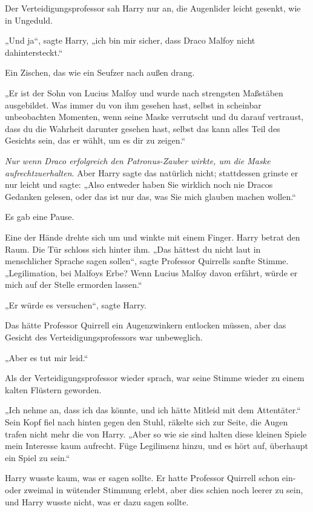 {Der Verteidigungsprofessor sah Harry nur an, die Augenlider leicht gesenkt, wie in Ungeduld.

„Und ja“, sagte Harry, „ich bin mir sicher, dass Draco Malfoy nicht dahintersteckt.“

Ein Zischen, das wie ein Seufzer nach außen drang.

„Er ist der Sohn von Lucius Malfoy und wurde nach strengsten Maßstäben ausgebildet. Was immer du von ihm gesehen hast, selbst in scheinbar unbeobachten Momenten, wenn seine Maske verrutscht und du darauf vertraust, dass du die Wahrheit darunter gesehen hast, selbst das kann alles Teil des Gesichts sein, das er wählt, um es dir zu zeigen.“

\emph{Nur wenn Draco erfolgreich den Patronus-Zauber wirkte, um die Maske aufrechtzuerhalten}. Aber Harry sagte das natürlich nicht; stattdessen grinste er nur leicht und sagte: „Also entweder haben Sie wirklich noch nie Dracos Gedanken gelesen, oder das ist nur das, was Sie mich glauben machen wollen.“

Es gab eine Pause.

Eine der Hände drehte sich um und winkte mit einem Finger. Harry betrat den Raum. Die Tür schloss sich hinter ihm. „Das hättest du nicht laut in menschlicher Sprache sagen sollen“, sagte Professor Quirrells sanfte Stimme. „Legilimation, bei Malfoys Erbe? Wenn Lucius Malfoy davon erfährt, würde er mich auf der Stelle ermorden lassen.“

„Er würde es versuchen“, sagte Harry.

Das hätte Professor Quirrell ein Augenzwinkern entlocken müssen, aber das Gesicht des Verteidigungsprofessors war unbeweglich.

„Aber es tut mir leid.“

Als der Verteidigungsprofessor wieder sprach, war seine Stimme wieder zu einem kalten Flüstern geworden.

„Ich nehme an, dass ich das könnte, und ich hätte Mitleid mit dem Attentäter.“ Sein Kopf fiel nach hinten gegen den Stuhl, räkelte sich zur Seite, die Augen trafen nicht mehr die von Harry. „Aber so wie sie sind halten diese kleinen Spiele mein Interesse kaum aufrecht. Füge Legilimenz hinzu, und es hört auf, überhaupt ein Spiel zu sein.“

Harry wusste kaum, was er sagen sollte. Er hatte Professor Quirrell schon ein- oder zweimal in wütender Stimmung erlebt, aber dies schien noch leerer zu sein, und Harry wusste nicht, was er dazu sagen sollte.

}
